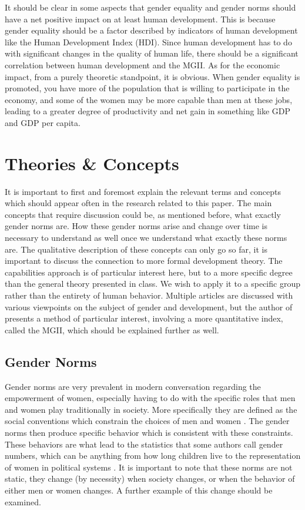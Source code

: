 \documentclass[12pt, letterpaper]{article}
\begin{document}
It should be clear in some aspects that gender equality and gender norms should have a net positive impact on at least human development. This is because gender equality should be a factor described by indicators of human development like the Human Development Index (HDI). Since human development has to do with significant changes in the quality of human life, there should be a significant correlation between human development and the MGII. As for the economic impact, from a purely theoretic standpoint, it is obvious. When gender equality is promoted, you have more of the population that is willing to participate in the economy, and some of the women may be more capable than men at these jobs, leading to a greater degree of productivity and net gain in something like GDP and GDP per capita. 

\section{Theories \& Concepts}
It is important to first and foremost explain the relevant terms and concepts which should appear often in the research related to this paper. The main concepts that require discussion could be, as mentioned before, what exactly gender norms are. How these gender norms arise and change over time is necessary to understand as well once we understand what exactly these norms are. The qualitative description of these concepts can only go so far, it is important to discuss the connection to more formal development theory. The capabilities approach is of particular interest here, but to a more specific degree than the general theory presented in class. We wish to apply it to a specific group rather than the entirety of human behavior. Multiple articles are discussed with various viewpoints on the subject of gender and development, but the author of \cite{ferrant, ferrant2} presents a method of particular interest, involving a more quantitative index, called the MGII, which should be explained further as well.

\subsection{Gender Norms}
Gender norms are very prevalent in modern conversation regarding the empowerment of women, especially having to do with the specific roles that men and women play traditionally in society. More specifically they are defined as the social conventions which constrain the choices of men and women \cite{elson}. The gender norms then produce specific behavior which is consistent with these constraints. These behaviors are what lead to the statistics that some authors call gender numbers, which can be anything from how long children live \footnotemark[1] to the representation of women in political systems \cite{bhatt, elson}. It is important to note that these norms are not static, they change (by necessity) when society changes, or when the behavior of either men or women changes. A further example of this change should be examined.
\end{document}
